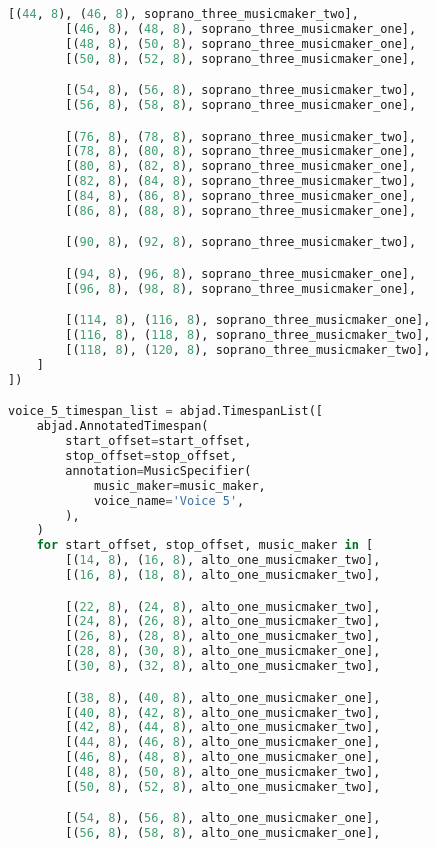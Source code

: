 \begin{lstlisting}[language=Python, caption=Invocation Source Code]
        [(44, 8), (46, 8), soprano_three_musicmaker_two],
        [(46, 8), (48, 8), soprano_three_musicmaker_one],
        [(48, 8), (50, 8), soprano_three_musicmaker_one],
        [(50, 8), (52, 8), soprano_three_musicmaker_one],

        [(54, 8), (56, 8), soprano_three_musicmaker_two],
        [(56, 8), (58, 8), soprano_three_musicmaker_one],

        [(76, 8), (78, 8), soprano_three_musicmaker_two],
        [(78, 8), (80, 8), soprano_three_musicmaker_one],
        [(80, 8), (82, 8), soprano_three_musicmaker_one],
        [(82, 8), (84, 8), soprano_three_musicmaker_two],
        [(84, 8), (86, 8), soprano_three_musicmaker_one],
        [(86, 8), (88, 8), soprano_three_musicmaker_one],

        [(90, 8), (92, 8), soprano_three_musicmaker_two],

        [(94, 8), (96, 8), soprano_three_musicmaker_one],
        [(96, 8), (98, 8), soprano_three_musicmaker_one],

        [(114, 8), (116, 8), soprano_three_musicmaker_one],
        [(116, 8), (118, 8), soprano_three_musicmaker_two],
        [(118, 8), (120, 8), soprano_three_musicmaker_two],
    ]
])

voice_5_timespan_list = abjad.TimespanList([
    abjad.AnnotatedTimespan(
        start_offset=start_offset,
        stop_offset=stop_offset,
        annotation=MusicSpecifier(
            music_maker=music_maker,
            voice_name='Voice 5',
        ),
    )
    for start_offset, stop_offset, music_maker in [
        [(14, 8), (16, 8), alto_one_musicmaker_two],
        [(16, 8), (18, 8), alto_one_musicmaker_two],

        [(22, 8), (24, 8), alto_one_musicmaker_two],
        [(24, 8), (26, 8), alto_one_musicmaker_two],
        [(26, 8), (28, 8), alto_one_musicmaker_two],
        [(28, 8), (30, 8), alto_one_musicmaker_one],
        [(30, 8), (32, 8), alto_one_musicmaker_two],

        [(38, 8), (40, 8), alto_one_musicmaker_one],
        [(40, 8), (42, 8), alto_one_musicmaker_two],
        [(42, 8), (44, 8), alto_one_musicmaker_two],
        [(44, 8), (46, 8), alto_one_musicmaker_one],
        [(46, 8), (48, 8), alto_one_musicmaker_one],
        [(48, 8), (50, 8), alto_one_musicmaker_two],
        [(50, 8), (52, 8), alto_one_musicmaker_two],

        [(54, 8), (56, 8), alto_one_musicmaker_one],
        [(56, 8), (58, 8), alto_one_musicmaker_one],


\end{lstlisting}
